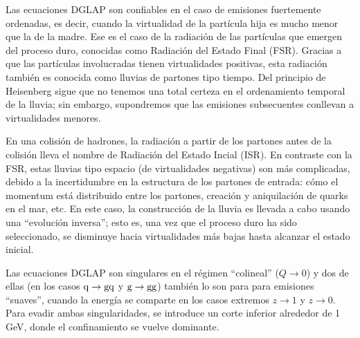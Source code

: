 \documentclass[a4paper,12pt]{article}
\begin{document}
Las ecuaciones DGLAP son confiables en el caso de emisiones fuertemente ordenadas, es decir, cuando la virtualidad de la partícula hija es mucho menor que la de la madre. Ese es el caso de la radiación de las partículas que emergen del proceso duro, conocidas como Radiación del Estado Final (FSR). Gracias a que las partículas involucradas tienen virtualidades positivas, esta radiación también es conocida como lluvias de partones tipo tiempo. Del principio de Heisenberg sigue que no tenemos una total certeza en el ordenamiento temporal de la lluvia; sin embargo, supondremos que las emisiones subsecuentes conllevan a virtualidades menores.

En una colisión de hadrones, la radiación a partir de los partones antes de la colisión lleva el nombre de Radiación del Estado Incial (ISR). En contraste con la FSR, estas lluvias tipo espacio (de virtualidades negativas) son más complicadas, debido a la incertidumbre en la estructura de los partones de entrada: cómo el momentum está distribuido entre los partones, creación y aniquilación de quarks en el mar, etc. En este caso, la construcción de la lluvia es llevada a cabo usando una ``evolución inversa''; esto es, una vez que el proceso duro ha sido seleccionado, se disminuye hacia virtualidades más bajas hasta alcanzar el estado inicial.

Las ecuaciones DGLAP son singulares en el régimen ``colineal'' ($Q\to0$) y dos de ellas (en los casos ${\mathrm q}\to{\mathrm g}{\mathrm q}$ y ${\mathrm g}\to{\mathrm g}{\mathrm g}$) también lo son para para emisiones ``suaves'', cuando la energía se comparte en los casos extremos $z\to1$ y $z\to0$. Para evadir ambas singularidades, se introduce un corte inferior alrededor de 1 GeV, donde el confinamiento se vuelve dominante.
\end{document}

